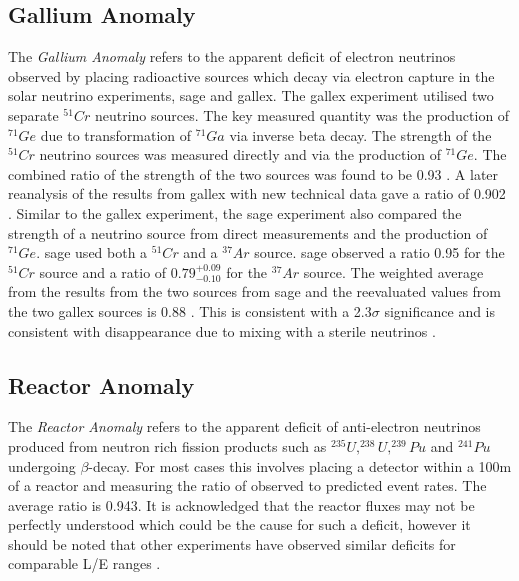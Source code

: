 \subsection{Gallium Anomaly}
The \textit{Gallium Anomaly} refers to the apparent deficit of electron neutrinos observed by placing radioactive sources which decay via electron capture in the solar neutrino experiments, \gls{sage} and \gls{gallex}. The \gls{gallex} experiment utilised two separate $^{51}Cr$ neutrino sources. The key measured quantity was the production of $^{71}Ge$ due to transformation of $^{71}Ga$ via inverse beta decay. The strength of the $^{51}Cr$ neutrino sources was measured directly and via the production of $^{71}Ge$. The combined ratio of the strength of the two sources was found to be 0.93 \cite{GALLEX}. A later reanalysis of the results from \gls{gallex} with new technical data gave a ratio of 0.902 \cite{Gallex_reanalysis}. Similar to the \gls{gallex} experiment, the \gls{sage} experiment also compared the strength of a neutrino source from direct measurements and the production of $^{71}Ge$. \gls{sage} used both a $^{51}Cr$ and a $^{37}Ar$ source.  \gls{sage} observed a ratio 0.95 for the $^{51}Cr$ source and a ratio of $0.79^{+0.09}_{-0.10}$ for the $^{37}Ar$ source. The weighted average from the results from the two sources from \gls{sage} and the reevaluated values from the two \gls{gallex} sources is 0.88 \cite{SAGE}. This is consistent with a 2.3$\sigma$ significance and is consistent with \nuebar disappearance due to mixing with a sterile neutrinos \cite{gallium_anomaly}.

\subsection{Reactor Anomaly}
The \textit{Reactor Anomaly} refers to the apparent deficit of anti-electron neutrinos produced from neutron rich fission products such as $^{235}U, ^{238}U, ^{239}Pu$ and $^{241}Pu$ undergoing  $\beta$-decay. For most cases this involves placing a detector within a 100m of a reactor and measuring the ratio of observed to predicted event rates. The average ratio is 0.943. It is acknowledged that the reactor fluxes may not be perfectly understood which could be the cause for such a deficit, however it should be noted that other experiments have observed similar deficits for comparable L/E ranges \cite{Reactor_anomaly}. 

